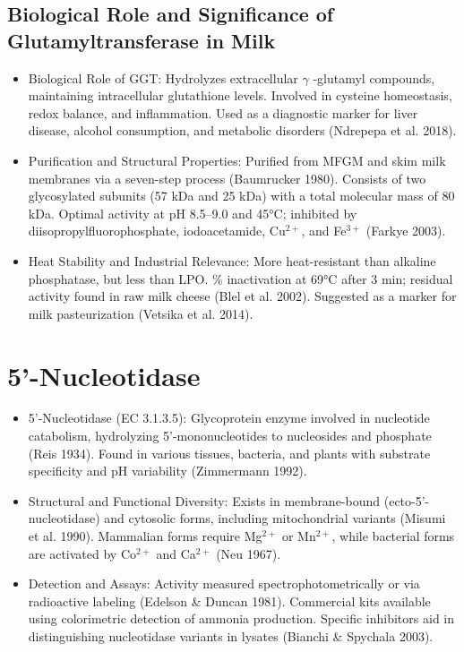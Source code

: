 \subsection*{Biological Role and Significance of Glutamyltransferase in Milk}
\begin{itemize}
    \item Biological Role of GGT:
    \subitem Hydrolyzes extracellular $\gamma$ -glutamyl compounds, maintaining intracellular glutathione levels.
    \subitem Involved in cysteine homeostasis, redox balance, and inflammation.
    \subitem Used as a diagnostic marker for liver disease, alcohol consumption, and metabolic disorders (Ndrepepa et al. 2018).

    \item Purification and Structural Properties:
    \subitem Purified from MFGM and skim milk membranes via a seven-step process (Baumrucker 1980).
    \subitem Consists of two glycosylated subunits (57 kDa and 25 kDa) with a total molecular mass of 80 kDa.
    \subitem Optimal activity at pH 8.5–9.0 and 45°C; inhibited by diisopropylfluorophosphate, iodoacetamide, Cu$^{2+}$, and Fe$^{3+}$ (Farkye 2003).

    \item Heat Stability and Industrial Relevance:
    \subitem More heat-resistant than alkaline phosphatase, but less than LPO.
    \% inactivation at 69°C after 3 min; residual activity found in raw milk cheese (Blel et al. 2002).
    \subitem Suggested as a marker for milk pasteurization (Vetsika et al. 2014).
\end{itemize}

\section{5'-Nucleotidase}
\begin{itemize}
    \item 5’-Nucleotidase (EC 3.1.3.5):
    \subitem Glycoprotein enzyme involved in nucleotide catabolism, hydrolyzing 5’-mononucleotides to nucleosides and phosphate (Reis 1934).
    \subitem Found in various tissues, bacteria, and plants with substrate specificity and pH variability (Zimmermann 1992).

    \item Structural and Functional Diversity:
    \subitem Exists in membrane-bound (ecto-5’-nucleotidase) and cytosolic forms, including mitochondrial variants (Misumi et al. 1990).
    \subitem Mammalian forms require Mg$^{2+}$ or Mn$^{2+}$, while bacterial forms are activated by Co$^{2+}$ and Ca$^{2+}$ (Neu 1967).

    \item Detection and Assays:
    \subitem Activity measured spectrophotometrically or via radioactive labeling (Edelson \& Duncan 1981).
    \subitem Commercial kits available using colorimetric detection of ammonia production.
    \subitem Specific inhibitors aid in distinguishing nucleotidase variants in lysates (Bianchi \& Spychala 2003).
\end{itemize}

